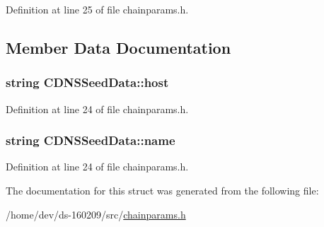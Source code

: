Definition at line 25 of file chainparams.\+h.



\subsection{Member Data Documentation}
\hypertarget{struct_c_d_n_s_seed_data_a19b30302d59eafcd286a7e7609fc0073}{}
\subsubsection[{host}]{\setlength{\rightskip}{0pt plus 5cm}string C\+D\+N\+S\+Seed\+Data\+::host}\label{struct_c_d_n_s_seed_data_a19b30302d59eafcd286a7e7609fc0073}


Definition at line 24 of file chainparams.\+h.

\hypertarget{struct_c_d_n_s_seed_data_afd774485f34a942ee37dc2182f9ffadf}{}
\subsubsection[{name}]{\setlength{\rightskip}{0pt plus 5cm}string C\+D\+N\+S\+Seed\+Data\+::name}\label{struct_c_d_n_s_seed_data_afd774485f34a942ee37dc2182f9ffadf}


Definition at line 24 of file chainparams.\+h.



The documentation for this struct was generated from the following file\+:\begin{DoxyCompactItemize}
\item 
/home/dev/ds-\/160209/src/\hyperlink{chainparams_8h}{chainparams.\+h}\end{DoxyCompactItemize}
